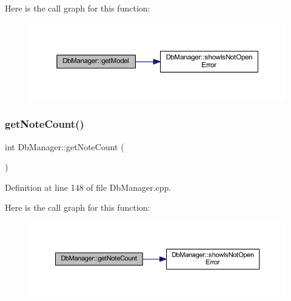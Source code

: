 Here is the call graph for this function\+:
\nopagebreak
\begin{figure}[H]
\begin{center}
\leavevmode
\includegraphics[width=350pt]{classDbManager_ac4e759380194e624382e267432de5357_cgraph}
\end{center}
\end{figure}
\hypertarget{classDbManager_ae3998b50545d88a27d4361053f39b050}{}\label{classDbManager_ae3998b50545d88a27d4361053f39b050} 
\subsubsection{\texorpdfstring{get\+Note\+Count()}{getNoteCount()}}
{\footnotesize\ttfamily int Db\+Manager\+::get\+Note\+Count (\begin{DoxyParamCaption}{ }\end{DoxyParamCaption})\hspace{0.3cm}{\ttfamily [static]}}



Definition at line 148 of file Db\+Manager.\+cpp.

Here is the call graph for this function\+:
\nopagebreak
\begin{figure}[H]
\begin{center}
\leavevmode
\includegraphics[width=350pt]{classDbManager_ae3998b50545d88a27d4361053f39b050_cgraph}
\end{center}
\end{figure}
\hypertarget{classDbManager_a92ebefd0d5fae643db1fc51cc7ea0c31}{}\label{classDbManager_a92ebefd0d5fae643db1fc51cc7ea0c31} 
